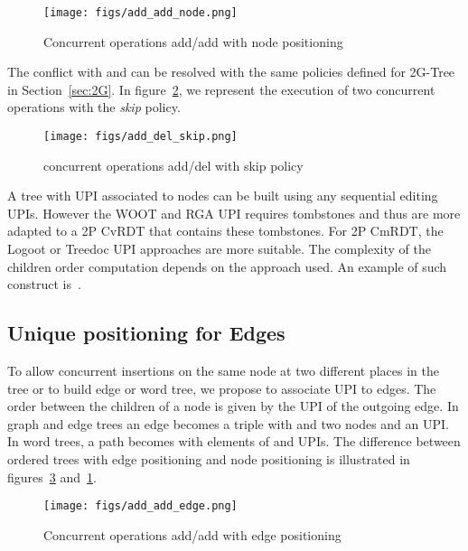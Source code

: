 \documentclass[a4paper]{article}
\begin{document}
\begin{figure}[H] 
\centering
\texttt{[image: figs/add\_add\_node.png]} 
\caption{Concurrent operations add/add with node positioning}
\label{fig:Diff_node} 
\end{figure} 


The conflict  with  and  can
be resolved with the same policies defined for 2G-Tree in
Section~\ref{sec:2G}. In figure~\ref{fig:Figure_add_del}, we represent
the execution of two concurrent operations  with
the {\em skip} policy.

\begin{figure}[H] 
\centering
\texttt{[image: figs/add\_del\_skip.png]} 
\caption{concurrent operations add/del with skip policy}
\label{fig:Figure_add_del} 
\end{figure} 

A tree with UPI associated to nodes can be built using any sequential
editing UPIs. However the WOOT and RGA UPI requires tombstones and
thus are more adapted to a 2P CvRDT that contains these
tombstones. For 2P CmRDT, the Logoot or Treedoc UPI approaches are
more suitable. The complexity of the children order computation
depends on the approach used. An example of such construct
is~\cite{martin09collaborative}.

\subsection{Unique positioning for Edges} 

To allow concurrent insertions on the same node at two different places
in the tree or to build edge or word tree, we propose to associate UPI
to edges. The order between the children of a node is given by the UPI
of the outgoing edge. In graph and edge trees an edge becomes a triple
 with  and  two nodes and  an UPI. In word trees,
a path becomes  with 
elements of  and  UPIs. The difference between ordered trees
with edge positioning and node positioning is illustrated in
figures~\ref{fig:Diff_edge} and~\ref{fig:Diff_node}.
\begin{figure}[H] 
  \centering
\texttt{[image: figs/add\_add\_edge.png]} 
\caption{Concurrent operations add/add with edge positioning}
\label{fig:Diff_edge} 
\end{figure} 
\end{document}
